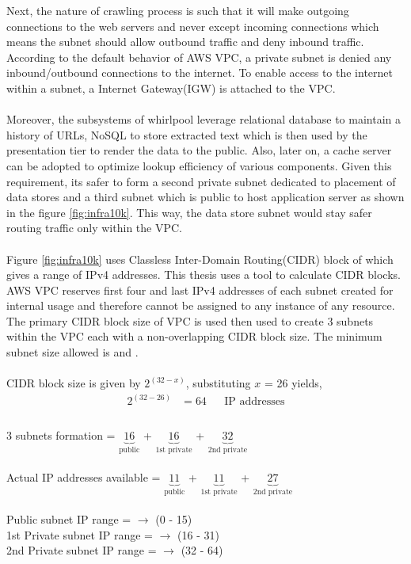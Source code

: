 \noindent
Next, the nature of crawling process is such that it will make outgoing connections to the web servers and never except incoming connections which means the subnet should allow outbound traffic and deny inbound traffic. According to the default behavior of AWS VPC, a private subnet is denied any inbound/outbound connections to the internet. To enable access to the internet within a subnet, a Internet Gateway(IGW) is attached to the VPC.
\\
\\
\noindent
Moreover, the subsystems of whirlpool leverage relational database to maintain a history of URLs, NoSQL to
store extracted text which is then used by the presentation tier to render the data to the public. Also,
later on, a cache server can be adopted to optimize lookup efficiency of various components. Given this
requirement, its safer to form a second private subnet dedicated to placement of data stores and a third
subnet which is public to host application server as shown in the figure \ref{fig:infra10k}. This way, the data store subnet would stay safer routing traffic only within the VPC.
\\
\\
\noindent
Figure \ref{fig:infra10k} uses Classless Inter-Domain Routing(CIDR) block of  which
gives a range of  IPv4 addresses. This thesis uses a tool \cite{cidr} to calculate CIDR
blocks. AWS VPC reserves first four and last IPv4 addresses of each subnet created for internal usage and
therefore cannot be assigned to any instance of any resource. The primary CIDR block size of VPC is used
then used to create 3 subnets within the VPC each with a non-overlapping CIDR block size. The minimum
subnet size allowed is  and .
\\
\\
CIDR block size is given by $2^{(32 - x)}$, substituting $x$ = 26 yields,
\begin{align*}
  2^{(32 - 26)} &= 64 && \text{IP addresses} \\
\end{align*}
\\
3 subnets formation = $\underbrace{16}_\text{public}$ + $\underbrace{16}_\text{1st private}$ + $\underbrace{32}_\text{2nd private}$
\\
\\
Actual IP addresses available = $\underbrace{11}_\text{public}$ + $\underbrace{11}_\text{1st private}$ + $\underbrace{27}_\text{2nd private}$
\\
\\
Public subnet IP range =  $\rightarrow$ (0 - 15)
\\                                                
1st Private subnet IP range =  $\rightarrow$ (16 - 31)
\\                                                
2nd Private subnet IP range =  $\rightarrow$ (32 - 64)